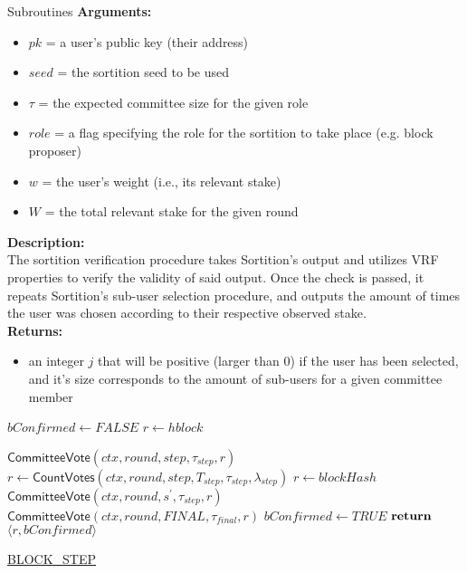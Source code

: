 \documentclass[10pt,a4paper]{article}
\begin{document}
\begin{section}{Subroutines}
\noindent \textbf{Arguments:}
\begin{itemize}
    \item $pk$ = a user's public key (their address)
    \item $seed$ = the sortition seed to be used
    \item $\tau$ = the expected committee size for the given role
    \item $role$ = a flag specifying the role for the sortition to take place (e.g. block proposer)
    \item $w$ = the user's weight (i.e., its relevant stake)
    \item $W$ = the total relevant stake for the given round
  \end{itemize}

\noindent \textbf{Description:}\\
The sortition verification procedure takes Sortition's output and utilizes 
VRF properties to verify the validity of said output.
Once the check is passed, it repeats Sortition's sub-user selection procedure, 
and outputs the amount of times the user was chosen according to their respective 
observed stake.\\

\noindent \textbf{Returns:}
\begin{itemize}
    \item an integer $j$ that will be positive (larger than 0) if the user has been 
    selected, and it's size corresponds to the amount
    of sub-users for a given committee member
  \end{itemize}


\begin{algorithm}[H]
    \begin{algorithmic}[H]
        \State $bConfirmed \gets FALSE$
        \State $r \gets hblock$

        \State $\mathsf{CommitteeVote}(ctx, round, step, \tau_{step}, r)$
        \State $r \gets \mathsf{CountVotes}(ctx,round,step,T_{step},\tau_{step},\lambda_{step})$
            \State $r \gets blockHash$
                \State $\mathsf{CommitteeVote}(ctx, round, s^\prime, \tau_{step}, r)$
            \EndFor
                \State $\mathsf{CommitteeVote}(ctx, round, FINAL, \tau_{final}, r)$
            \EndIf
            \State $bConfirmed \gets TRUE$
        \EndIf
        $\Return$ $ \langle r, bConfirmed \rangle$
    \EndFunction
    \end{algorithmic}
    \caption{\underline{BLOCK\_STEP}}
\end{algorithm}


\end{section}
\end{document}
